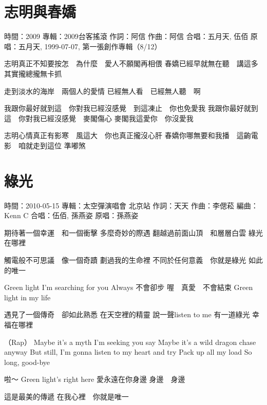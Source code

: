 \documentclass[UTF8,a4paper,oneside,twocolumn,12pt]{ctexbook}
\newcommand{\infopair}[2]{\textbullet #1：#2}
\newcommand{\zc}[1][伍佰]{\infopair{作詞}{#1}}
\newcommand{\zq}[1][伍佰]{\infopair{作曲}{#1}}
\newcommand{\bq}[1][伍佰]{\infopair{編曲}{#1}}
\newcommand{\zj}[1]{\infopair{專輯}{#1}}
\newcommand{\yc}[1]{\infopair{原唱}{#1}}
\newcommand{\sj}[1]{\infopair{時間}{#1}}
\newenvironment{info}{\begin{flushleft}\kaishu
	}
	{\end{flushleft}\normalsize\yahei\par}
\newenvironment{lyric}{
	}
{}
\begin{document}
\section{志明與春嬌}
\begin{info}
	\sj{2009}
	\zj{2009台客搖滾}
	\zc[阿信]
	\zq[阿信]
	\infopair{合唱}{五月天, 伍佰}
	\yc{五月天, 1999-07-07, 第一張創作專輯（8/12）}
\end{info}
\begin{lyric}
	志明真正不知要按怎　為什麼　愛人不願閣再相偎
	春嬌已經早就無在聽　講這多　其實攏總攏無卡抓

	走到淡水的海岸　兩個人的愛情
	已經無人看　已經無人聽　啊

	我跟你最好就到這　你對我已經沒感覺　到這凍止　你也免愛我
	我跟你最好就到這　你對我已經沒感覺　麥閣傷心
	麥閣我這愛你　你沒愛我

	志明心情真正有影寒　風這大　你也真正攏沒心肝
	春嬌你哪無要和我播　這齣電影　咱就走到這位  準嘟煞
\end{lyric}

\section{綠光}
\begin{info}
	\sj{2010-05-15}
	\zj{太空彈演唱會 北京站}
	\zc[天天]
	\zq[李偲菘]
	\bq[Kenn C]
	\infopair{合唱}{伍佰, 孫燕姿}
	\yc{孫燕姿}
\end{info}
\begin{lyric}
	期待著一個幸運　和一個衝擊
	多麼奇妙的際遇
	翻越過前面山頂　和層層白雲
	綠光在哪裡

	觸電般不可思議　像一個奇蹟
	劃過我的生命裡
	不同於任何意義　你就是綠光
	如此的唯一

	Green light   I'm searching for you
	Always   不會卻步
	喔　真愛　不會結束
	Green light in my life

	遇見了一個傳奇　卻如此熟悉
	在天空裡的精靈
	說一聲listen to me 有一道綠光
	幸福在哪裡

	（Rap）
	Maybe it's a myth I'm seeking you say
	Maybe it's a wild dragon chase anyway
	But still, I'm gonna listen to my heart and try
	Pack up all my load
	So long, good-bye

	啦～
	Green light's right here
	愛永遠在你身邊
	身邊　身邊

	這是最美的傳遞
	在我心裡　你就是唯一
\end{lyric}
\end{document}
